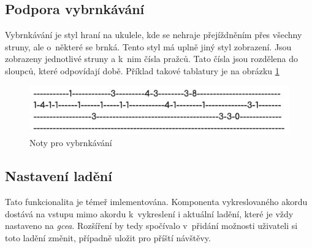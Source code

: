\subsection*{Podpora vybrnkávání}
Vybrnkávání je styl hraní na ukulele, kde se nehraje přejíždněním přes všechny struny, ale o~některé se brnká. Tento styl má uplně jiný styl zobrazení. Jsou zobrazeny jednotlivé struny a k~nim čísla pražců. Tato čísla jsou rozdělena do sloupců, které odpovídají době. Příklad takové tablatury je na obrázku \ref{fig:tablature}

\begin{figure}[h!]
    \centering
    \includegraphics[width=\textwidth]{assets/picking.png}
    \caption{Noty pro vybrnkávání}
    \label{fig:tablature}
\end{figure}

\subsection*{Nastavení ladění}
Tato funkcionalita je témeř imlementována. Komponenta vykreslovaného akordu dostává na vstupu mimo akordu k~vykreslení i aktuální ladění, které je vždy nastaveno na \emph{gcea}. Rozšíření by tedy spočívalo v~přidání možnosti uživateli si toto ladění změnit, případně uložit pro příští návštěvy.

